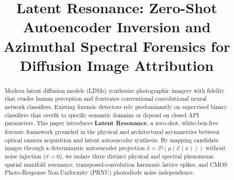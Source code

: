 \documentclass[conference]{IEEEtran}
\theoremstyle{definition}
\begin{document}
\title{Latent Resonance: Zero-Shot Autoencoder Inversion and Azimuthal Spectral Forensics for Diffusion Image Attribution}

\author{
}

\maketitle

\begin{abstract}
Modern latent diffusion models (LDMs) synthesize photographic imagery with fidelity that evades human perception and frustrates conventional convolutional neural network classifiers. Existing forensic detectors rely predominantly on supervised binary classifiers that overfit to specific semantic domains or depend on closed API parameters. This paper introduces \textbf{Latent Resonance}, a zero-shot, white-box-free forensic framework grounded in the physical and architectural asymmetries between optical camera acquisition and latent autoencoder synthesis. By mapping candidate images through a deterministic autoencoder projection $\hat{x} = \mathcal{D}(\mu(\mathcal{E}(x)))$ without noise injection ($\sigma = 0$), we isolate three distinct physical and spectral phenomena: spatial manifold resonance, transposed-convolution harmonic lattice spikes, and CMOS Photo-Response Non-Uniformity (PRNU) photodiode noise independence.


\end{abstract}
\end{document}
